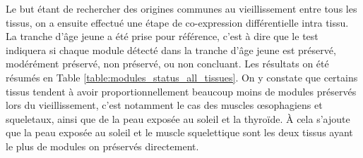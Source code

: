 Le but étant de rechercher des origines communes au vieillissement entre tous les tissus, on a ensuite effectué une étape de co-expression différentielle intra tissu. La tranche d'âge jeune a été prise pour référence, c'est à dire que le test indiquera si chaque module détecté dans la tranche d'âge jeune est préservé, modérément préservé, non préservé, ou non concluant. Les résultats on été résumés en Table \ref{table:modules_status_all_tissues}. On y constate que certains tissus tendent à avoir proportionnellement beaucoup moins de modules préservés lors du vieillissement, c'est notamment le cas des muscles œsophagiens et squeletaux, ainsi que de la peau exposée au soleil et la thyroïde. À cela s'ajoute que la peau exposée au soleil et le muscle squelettique sont les deux tissus ayant le plus de modules on préservés directement.

